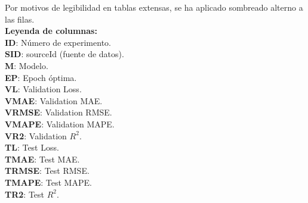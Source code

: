 \begin{landscape}
\vspace{0.5em}
\begin{minipage}{0.99\textwidth}
\footnotesize
Por motivos de legibilidad en tablas extensas, se ha aplicado sombreado alterno a las filas.
\\[0.4em]
\textbf{Leyenda de columnas:} \\
\textbf{ID}: Número de experimento. \\
\textbf{SID}: sourceId (fuente de datos). \\
\textbf{M}: Modelo. \\
\textbf{EP}: Epoch óptima. \\
\textbf{VL}: Validation Loss. \\
\textbf{VMAE}: Validation MAE. \\
\textbf{VRMSE}: Validation RMSE. \\
\textbf{VMAPE}: Validation MAPE. \\
\textbf{VR2}: Validation $R^2$. \\
\textbf{TL}: Test Loss. \\
\textbf{TMAE}: Test MAE. \\
\textbf{TRMSE}: Test RMSE. \\
\textbf{TMAPE}: Test MAPE. \\
\textbf{TR2}: Test $R^2$.\\
\end{minipage}

\end{landscape}

